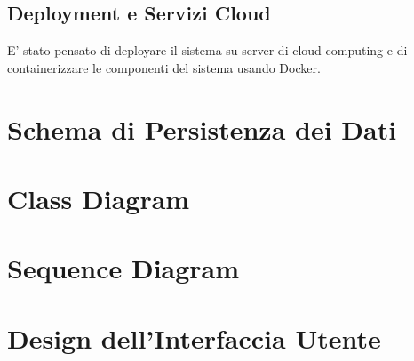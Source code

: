 \subsection{Deployment e Servizi Cloud}
E' stato pensato di deployare il sistema su server di cloud-computing e di containerizzare le componenti del sistema usando Docker.




\section{Schema di Persistenza dei Dati}
\section{Class Diagram}
\section{Sequence Diagram}
\section{Design dell'Interfaccia Utente}